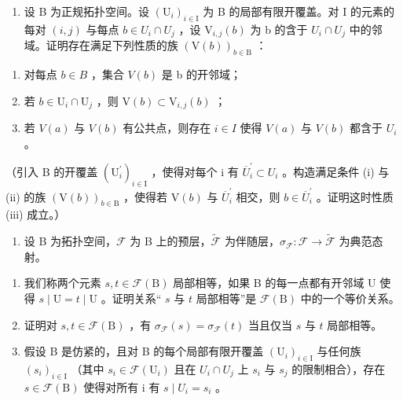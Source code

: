 \begin{enumerate}
\def\labelenumi{\arabic{enumi})}
\setcounter{enumi}{6}
\tightlist
\item
  设 B 为正规拓扑空间。设 \((\mathrm{U}_{i})_{i\in\mathrm{I}}\) 为 B 的局部有限开覆盖。对 I 的元素的每对 \((i,j)\) 与每点 \(b\in U_{i}\cap U_{j}\) ，设 \(\mathrm{V}_{i,j}(b)\) 为 b 的含于 \(U_{i}\cap U_{j}\) 中的邻域。证明存在满足下列性质的族 \((\mathrm{V}(b))_{b\in\mathrm{B}}\) ：
\end{enumerate}

\begin{enumerate}
\def\labelenumi{(\roman{enumi})}
\item
  对每点 \(b \in B\) ，集合 \(V(b)\) 是 b 的开邻域；
\item
  若 \(b \in \mathrm{U}_i \cap \mathrm{U}_j\) ，则 \(\mathrm{V}(b) \subset \mathrm{V}_{i,j}(b)\) ；
\item
  若 \(V(a)\) 与 \(V(b)\) 有公共点，则存在 \(i \in I\) 使得 \(V(a)\) 与 \(V(b)\) 都含于 \(U_i\) 。
\end{enumerate}

（引入 B 的开覆盖 \((\mathrm{U}_{i}^{\prime})_{i\in\mathrm{I}}\) ，使得对每个 i 有 \(\overline{U}_{i}^{\prime}\subset U_{i}\) 。构造满足条件 (i) 与 (ii) 的族 \((\mathrm{V}(b))_{b\in\mathrm{B}}\) ，使得若 \(\mathrm{V}(b)\) 与 \(\overline{U}_{i}^{\prime}\) 相交，则 \(b\in\overline{U}_{i}^{\prime}\) 。证明这时性质 (iii) 成立。）

\begin{enumerate}
\def\labelenumi{\arabic{enumi})}
\setcounter{enumi}{7}
\tightlist
\item
  设 B 为拓扑空间，\(\mathcal{F}\) 为 B 上的预层，\(\widetilde{\mathcal{F}}\) 为伴随层，\(\sigma_{\mathcal{F}}\colon \mathcal{F}\to \widetilde{\mathcal{F}}\) 为典范态射。
\end{enumerate}

\begin{enumerate}
\def\labelenumi{\alph{enumi})}
\item
  我们称两个元素 \(s, t \in \mathcal{F}(\mathrm{B})\) 局部相等，如果 B 的每一点都有开邻域 U 使得 \(s \mid \mathrm{U} = t \mid \mathrm{U}\) 。证明关系“ \(s\) 与 \(t\) 局部相等”是 \(\mathcal{F}(\mathrm{B})\) 中的一个等价关系。
\item
  证明对 \(s, t \in \mathcal{F}(\mathrm{B})\) ，有 \(\sigma_{\mathcal{F}}(s) = \sigma_{\mathcal{F}}(t)\) 当且仅当 \(s\) 与 \(t\) 局部相等。
\item
  假设 B 是仿紧的，且对 B 的每个局部有限开覆盖 \((\mathrm{U}_{i})_{i\in\mathrm{I}}\) 与任何族 \((s_{i})_{i\in\mathrm{I}}\) （其中 \(s_{i}\in\mathcal{F}(\mathrm{U}_{i})\) 且在 \(U_{i}\cap U_{j}\) 上 \(s_{i}\) 与 \(s_{j}\) 的限制相合），存在 \(s\in\mathcal{F}(\mathrm{B})\) 使得对所有 i 有 \(s\mid U_{i}=s_{i}\) 。
\end{enumerate}

